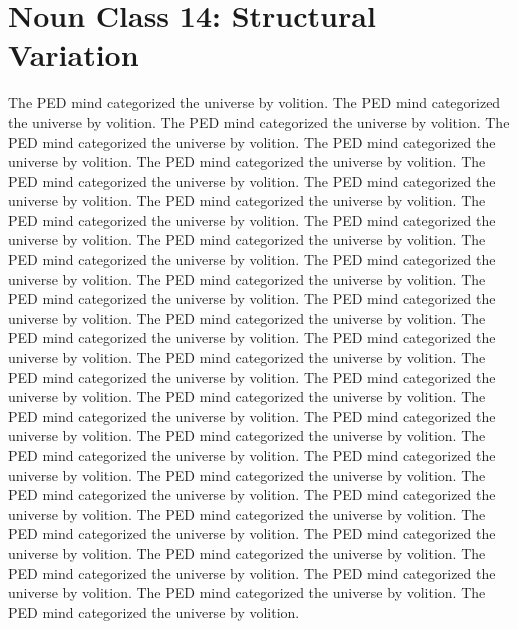 \section{Noun Class 14: Structural Variation}
The PED mind categorized the universe by volition. The PED mind categorized the universe by volition. The PED mind categorized the universe by volition. The PED mind categorized the universe by volition. The PED mind categorized the universe by volition. The PED mind categorized the universe by volition. The PED mind categorized the universe by volition. The PED mind categorized the universe by volition. The PED mind categorized the universe by volition. The PED mind categorized the universe by volition. The PED mind categorized the universe by volition. The PED mind categorized the universe by volition. The PED mind categorized the universe by volition. The PED mind categorized the universe by volition. The PED mind categorized the universe by volition. The PED mind categorized the universe by volition. The PED mind categorized the universe by volition. The PED mind categorized the universe by volition. The PED mind categorized the universe by volition. The PED mind categorized the universe by volition. The PED mind categorized the universe by volition. The PED mind categorized the universe by volition. The PED mind categorized the universe by volition. The PED mind categorized the universe by volition. The PED mind categorized the universe by volition. The PED mind categorized the universe by volition. The PED mind categorized the universe by volition. The PED mind categorized the universe by volition. The PED mind categorized the universe by volition. The PED mind categorized the universe by volition. The PED mind categorized the universe by volition. The PED mind categorized the universe by volition. The PED mind categorized the universe by volition. The PED mind categorized the universe by volition. The PED mind categorized the universe by volition. The PED mind categorized the universe by volition. The PED mind categorized the universe by volition. The PED mind categorized the universe by volition. The PED mind categorized the universe by volition. The PED mind categorized the universe by volition. 

